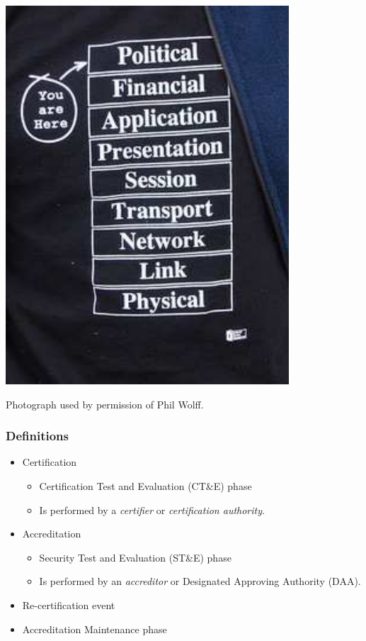 \documentclass{beamer}
\begin{document}
\begin{frame}
	\begin{center}
		\includegraphics{ISO-9-layer-model-smaller.pdf}
	\end{center}
	\tiny{Photograph used by permission of Phil Wolff.}
\end{frame}

\begin{frame}
	\frametitle{Definitions}
	\begin{itemize}
		\item Certification
			\begin{itemize}
				\item Certification Test and Evaluation (CT\&E) phase
				\item Is performed by a \emph{certifier} or \emph{certification authority}.
			\end{itemize}
		\item Accreditation
			\begin{itemize}
				\item Security Test and Evaluation (ST\&E) phase
				\item Is performed by an \emph{accreditor} or Designated Approving Authority
					(DAA).
			\end{itemize}
		\item Re-certification event
		\item Accreditation Maintenance phase
	\end{itemize}
\end{frame}
\end{document}
